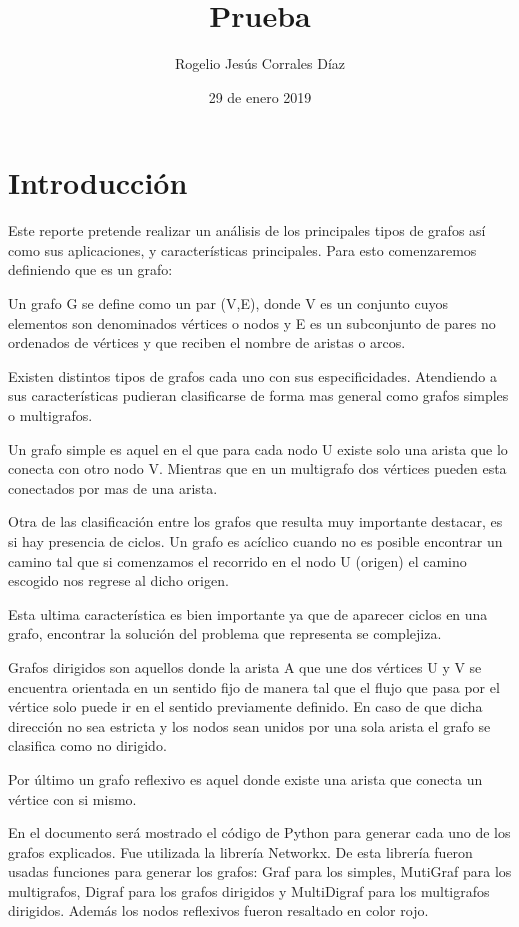 \documentclass{article}
\title{Prueba}
\date{29 de enero 2019}
\author{Rogelio Jes\'us Corrales D\'iaz}
\begin{document}
\maketitle


\section{Introducción}

Este reporte pretende realizar un análisis de los principales tipos de grafos así como sus aplicaciones, y características principales. Para esto comenzaremos definiendo que es un grafo:

Un grafo G se define como un par (V,E), donde V es un conjunto cuyos elementos son denominados vértices o nodos y E es un subconjunto de pares no ordenados de vértices y que reciben el nombre de aristas o arcos.

Existen distintos tipos de grafos cada uno con sus especificidades. Atendiendo a sus características pudieran clasificarse de forma mas general como grafos simples o multigrafos.

Un grafo simple es aquel en el que para cada nodo U existe solo una arista que lo conecta con otro nodo V. Mientras que en un multigrafo dos vértices pueden esta conectados por mas de una arista.

Otra de las clasificación entre los grafos que resulta muy importante destacar, es si hay presencia de ciclos. Un grafo es acíclico cuando no es posible encontrar un camino tal que si comenzamos el recorrido en el nodo U (origen) el camino escogido nos regrese al dicho origen.

Esta ultima característica es bien importante ya que de aparecer ciclos en una grafo, encontrar la solución del problema que representa se complejiza.

Grafos dirigidos son aquellos donde la arista A que une dos vértices U y V se encuentra orientada en un sentido fijo de manera tal que el flujo que pasa por el vértice solo puede ir en el sentido previamente definido. En caso de que dicha dirección no sea estricta y los nodos sean unidos por una sola arista el grafo se clasifica como no dirigido.

Por último un grafo reflexivo es aquel donde existe una arista que conecta un vértice con si mismo.

En el documento ser\'a mostrado el c\'odigo de Python para generar cada uno de los grafos explicados. Fue utilizada la librer\'ia Networkx. De esta librer\'ia fueron usadas funciones para generar los grafos:
Graf para los simples, MutiGraf para los multigrafos, Digraf para los grafos dirigidos y MultiDigraf para los multigrafos dirigidos. Adem\'as los nodos reflexivos fueron resaltado en color rojo. 
 
\end{document}
